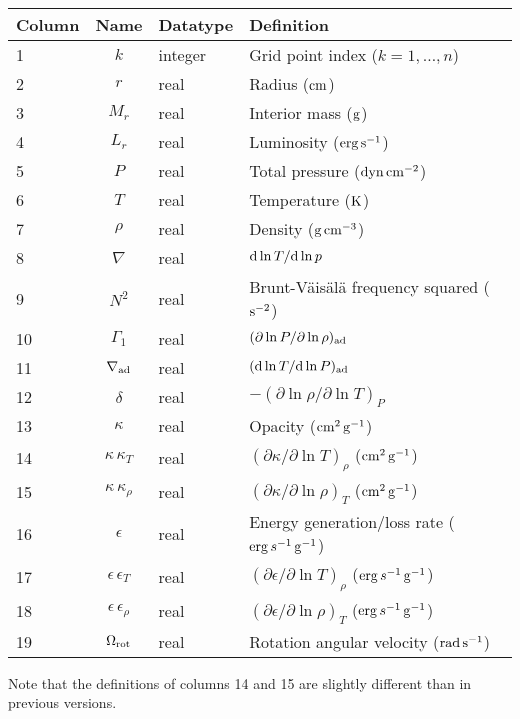 \documentclass{article}
\newcommand{\diff}{\ensuremath{{\rm d}}}
\newcommand{\cm}{\ensuremath{{\rm cm}}}
\newcommand{\gram}{\ensuremath{{\rm g}}}
\newcommand{\second}{\ensuremath{{\rm s}}}
\newcommand{\dyne}{\ensuremath{{\rm dyn}}}
\newcommand{\erg}{\ensuremath{{\rm erg}}}
\newcommand{\kelvin}{\ensuremath{{\rm K}}}
\begin{document}
\begin{table}[h!]
\begin{tabular}{|l|c|l|l|} \hline
Column & Name & Datatype & Definition \\ \hline
1      & $k$ & integer & Grid point index ($k=1,\ldots,n$) \\
2      & $r$ & real    & Radius ($\cm$) \\
3      & $M_{r}$ & real  & Interior mass ($\gram$) \\
4      & $L_{r}$ & real & Luminosity ($\erg\,\second^{-1}$) \\
5      & $P$ & real    & Total pressure ($\dyne\,\cm^{-2}$) \\
6      & $T$ & real    & Temperature ($\kelvin$) \\
7      & $\rho$ & real & Density ($\gram\,\cm^{-3}$) \\
8      & $\nabla$ & real & $\diff \ln T/\diff \ln p$ \\
9      & $N^{2}$ & real & Brunt-V\"ais\"al\"a frequency squared ($\second^{-2}$) \\
10     & $\Gamma_{1}$ & real & $(\partial \ln P/\partial \ln \rho)_{\rm ad}$ \\
11     & $\nabla_{\rm ad}$ & real & $(\diff \ln T/\diff \ln P)_{\rm ad}$ \\
12     & $\delta$ & real & $-(\partial \ln \rho/\partial \ln T)_{P}$  \\
13     & $\kappa$ & real & Opacity ($\cm^{2}\,\gram^{-1}$) \\
14     & $\kappa\,\kappa_{T}$ & real & $(\partial \kappa/\partial \ln T)_{\rho}$ ($\cm^{2}\,\gram^{-1}$) \\
15     & $\kappa\,\kappa_{\rho}$ & real & $(\partial \kappa/\partial \ln \rho)_{T}$ ($\cm^{2}\,\gram^{-1}$) \\
16     & $\epsilon$ & real & Energy generation/loss rate ($\erg\,s^{-1}\,\gram^{-1}$) \\
17     & $\epsilon\,\epsilon_{T}$ & real & $(\partial \epsilon/\partial \ln T)_{\rho}$ ($\erg\,s^{-1}\,\gram^{-1}$) \\
18     & $\epsilon\,\epsilon_{\rho}$ & real & $(\partial \epsilon/\partial \ln \rho)_{T}$ ($\erg\,s^{-1}\,\gram^{-1}$) \\
19     & $\Omega_{\rm rot}$ & real & Rotation angular velocity (${\rm rad}\,\second^{-1}$) \\  \hline
\end{tabular}
\end{table}

Note that the definitions of columns 14 and 15 are slightly different
than in previous versions.
\end{document}
